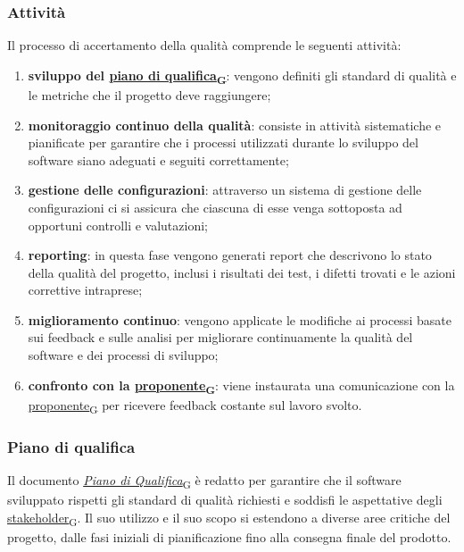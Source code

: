 \subsubsection{Attività}
Il processo di accertamento della qualità comprende le seguenti attività:
\begin{enumerate}
	\item \textbf{sviluppo del \href{https://7last.github.io/docs/pb/documentazione-interna/glossario\#piano-di-qualifica}{piano di qualifica\textsubscript{G}}}: vengono definiti gli standard di qualità e le metriche che il progetto deve raggiungere;
	\item \textbf{monitoraggio continuo della qualità}: consiste in attività sistematiche e pianificate per garantire che i processi utilizzati durante lo sviluppo del software siano adeguati e seguiti correttamente;
	\item \textbf{gestione delle configurazioni}: attraverso un sistema di gestione delle configurazioni ci si assicura che ciascuna di esse venga sottoposta ad opportuni controlli e valutazioni;
	\item \textbf{reporting}: in questa fase vengono generati report che descrivono lo stato della qualità del progetto, inclusi i risultati dei test, i difetti trovati e le azioni correttive intraprese;
	\item \textbf{miglioramento continuo}: vengono applicate le modifiche ai processi basate sui feedback e sulle analisi per migliorare continuamente la qualità del software e dei processi di sviluppo;
	\item \textbf{confronto con la \href{https://7last.github.io/docs/pb/documentazione-interna/glossario\#proponente}{proponente\textsubscript{G}}}: viene instaurata una comunicazione con la \href{https://7last.github.io/docs/pb/documentazione-interna/glossario\#proponente}{proponente\textsubscript{G}} per ricevere feedback costante sul lavoro svolto.
\end{enumerate}

\subsubsection{Piano di qualifica}
Il documento \href{https://7last.github.io/docs/pb/documentazione-interna/glossario\#piano-di-qualifica}{\textit{Piano di Qualifica}\textsubscript{G}} è redatto per garantire che il software sviluppato rispetti gli standard di qualità richiesti e soddisfi le aspettative degli \href{https://7last.github.io/docs/pb/documentazione-interna/glossario\#stakeholder}{stakeholder\textsubscript{G}}. Il suo utilizzo e il suo scopo si estendono a diverse aree critiche del progetto, dalle fasi iniziali di pianificazione fino alla consegna finale del prodotto.

